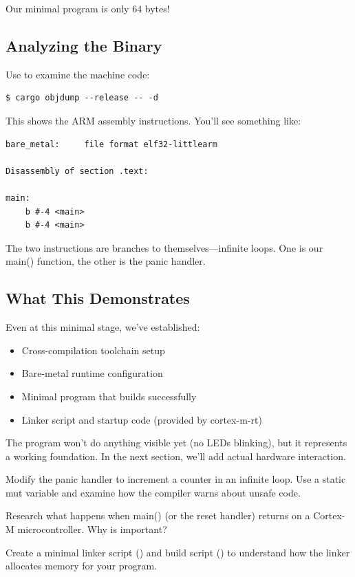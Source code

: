 Our minimal program is only 64 bytes!

\subsection{Analyzing the Binary}

Use  to examine the machine code:

\begin{verbatim}
$ cargo objdump --release -- -d
\end{verbatim}

This shows the ARM assembly instructions. You'll see something like:

\begin{verbatim}
bare_metal:     file format elf32-littlearm

Disassembly of section .text:

main:
    b #-4 <main>
    b #-4 <main>
\end{verbatim}

The two  instructions are branches to themselves---infinite loops. One is our main() function, the other is the panic handler.

\subsection{What This Demonstrates}

Even at this minimal stage, we've established:

\begin{itemize}
    \item Cross-compilation toolchain setup
    \item Bare-metal runtime configuration
    \item Minimal program that builds successfully
    \item Linker script and startup code (provided by cortex-m-rt)
\end{itemize}

The program won't do anything visible yet (no LEDs blinking), but it represents a working foundation. In the next section, we'll add actual hardware interaction.

\begin{exercise}[Easy]
    Modify the panic handler to increment a counter in an infinite loop. Use a static mut variable and examine how the compiler warns about unsafe code.
\end{exercise}

\begin{exercise}[Medium]
    Research what happens when main() (or the reset handler) returns on a Cortex-M microcontroller. Why is \codeinline{-> !} important?
\end{exercise}

\begin{exercise}[Hard]
    Create a minimal linker script () and build script () to understand how the linker allocates memory for your program.
\end{exercise}
\clearpage
